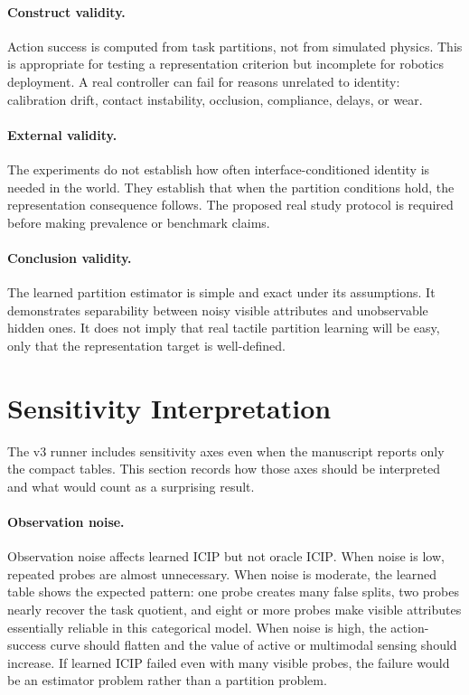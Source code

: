 \documentclass{article}
\newcommand{\icip}{\textsc{ICIP}}
\begin{document}
\paragraph{Construct validity.}
Action success is computed from task partitions, not from simulated physics.
This is appropriate for testing a representation criterion but incomplete for robotics deployment.
A real controller can fail for reasons unrelated to identity: calibration drift, contact instability, occlusion, compliance, delays, or wear.

\paragraph{External validity.}
The experiments do not establish how often interface-conditioned identity is needed in the world.
They establish that when the partition conditions hold, the representation consequence follows.
The proposed real study protocol is required before making prevalence or benchmark claims.

\paragraph{Conclusion validity.}
The learned partition estimator is simple and exact under its assumptions.
It demonstrates separability between noisy visible attributes and unobservable hidden ones.
It does not imply that real tactile partition learning will be easy, only that the representation target is well-defined.

\section{Sensitivity Interpretation}

The v3 runner includes sensitivity axes even when the manuscript reports only the compact tables.
This section records how those axes should be interpreted and what would count as a surprising result.

\paragraph{Observation noise.}
Observation noise affects learned \icip{} but not oracle \icip{}.
When noise is low, repeated probes are almost unnecessary.
When noise is moderate, the learned table shows the expected pattern: one probe creates many false splits, two probes nearly recover the task quotient, and eight or more probes make visible attributes essentially reliable in this categorical model.
When noise is high, the action-success curve should flatten and the value of active or multimodal sensing should increase.
If learned \icip{} failed even with many visible probes, the failure would be an estimator problem rather than a partition problem.
\end{document}
